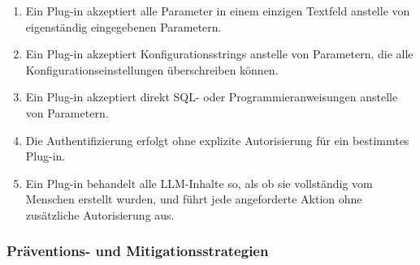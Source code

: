 \documentclass[
]{article}
\providecommand{\tightlist}{%
  \setlength{\itemsep}{0pt}\setlength{\parskip}{0pt}}
\begin{document}
\begin{enumerate}
\def\labelenumi{\arabic{enumi}.}
\tightlist
\item
  Ein Plug-in akzeptiert alle Parameter in einem einzigen Textfeld
  anstelle von eigenständig eingegebenen Parametern.
\item
  Ein Plug-in akzeptiert Konfigurationsstrings anstelle von Parametern,
  die alle Konfigurationseinstellungen überschreiben können.
\item
  Ein Plug-in akzeptiert direkt SQL- oder Programmieranweisungen
  anstelle von Parametern.
\item
  Die Authentifizierung erfolgt ohne explizite Autorisierung für ein
  bestimmtes Plug-in.
\item
  Ein Plug-in behandelt alle LLM-Inhalte so, als ob sie vollständig vom
  Menschen erstellt wurden, und führt jede angeforderte Aktion ohne
  zusätzliche Autorisierung aus.
\end{enumerate}

\subsubsection{Präventions- und
Mitigationsstrategien}\label{pruxe4ventions--und-mitigationsstrategien}
\end{document}

